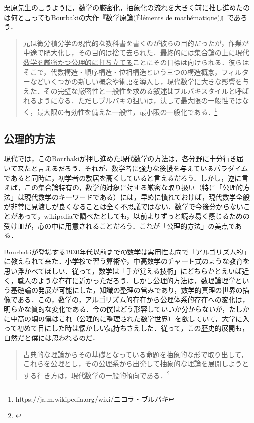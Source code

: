 \documentclass[uplatex, 12pt, a4paper, dvipdfmx]{jsarticle}
\begin{document}
栗原先生の言うように，数学の厳密化，抽象化の流れを大きく前に推し進めたのは何と言ってもBourbakiの大作『数学原論(Éléments de mathématique)』であろう．

\begin{quote}
	元は微分積分学の現代的な教科書を書くのが彼らの目的だったが，作業が中途で肥大化し，その目的は捨て去られた．最終的には\underline{集合論の上に現代数学を厳密かつ公理的に打ち立てる}ことにその目標は向けられる．彼らはそこで，代数構造・順序構造・位相構造という三つの構造概念，フィルターなどいくつかの新しい概念や術語を導入し，現代数学に大きな影響を与えた．その完璧な厳密性と一般性を求める叙述はブルバキスタイルと呼ばれるようになる．ただしブルバキの狙いは，決して最大限の一般性ではなく，最大限の有効性を備えた一般性，最小限の一般化である．\footnote{https://ja.m.wikipedia.org/wiki/ニコラ・ブルバキ}
\end{quote}

\subsection{公理的方法}

現代では，このBourbakiが押し進めた現代数学の方法は，各分野に十分行き届いて来たと言えるだろう．それが，数学者に強力な後援を与えているパラダイムであると同時に，初学者の敷居を高くしていると言えるだろう．しかし，逆に言えば，この集合論特有の，数学的対象に対する厳密な取り扱い（特に「公理的方法」は現代数学のキーワードである）には，早めに慣れておけば，現代数学全般が非常に見渡しが良くなることは全く不思議ではない．数学で今後分からないことがあって，wikipediaで調べたとしても，以前よりずっと読み易く感じるための受け皿が，心の中に用意されることだろう．これが「公理的方法」の美点である．\par

Bourbakiが登場する1930年代以前までの数学は実用性志向で「アルゴリズム的」に教えられて来た．小学校で習う算術や，中高数学のチャート式のような教育を思い浮かべてほしい．従って，数学は「手が覚える技術」にどちらかとえいば近く，職人のような存在に近かっただろう．しかし公理的方法は，数理論理学という基礎論の発展が可能にした，知識の整理の営みであり，数学的真理の世界の描像である．この，数学の，アルゴリズム的存在から公理体系的存在への変化は，明らかな質的な変化である．今の僕はどう形容していいか分からないが，たしかに中高の頃の僕はこれ（公理的に整理された数学世界）を欲していて，大学に入って初めて目にした時は懐かしい気持ちさえした．従って，この歴史的展開も，自然だと僕には思われるのだ．\par

\begin{quote}
	古典的な理論からその基礎となっている命題を抽象的な形で取り出して，これらを公理とし，その公理系から出発して抽象的な理論を展開しようとする行き方は，現代数学の一般的傾向である．\footnote{\cite{吉田洋一}}
\end{quote}
\end{document}
